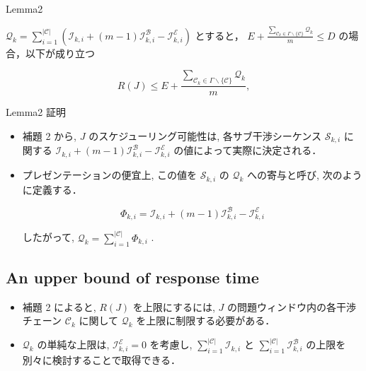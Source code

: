 \begin{frame}{Lemma2}
    \begin{lemma}[]
        $\mathcal{Q}_{k}=\sum_{i=1}^{|\mathcal{C}|}\left(\mathcal{I}_{k, i}+(m-1) \mathcal{I}_{k, i}^{\mathcal{B}}-\mathcal{I}_{k, i}^{\mathcal{E}}\right)$ とすると，
        $E+\frac{\sum_{\mathcal{C}_{k} \in \Gamma \backslash\{\mathcal{C}\}} \mathcal{Q}_{k}}{m} \leq D$ の場合，以下が成り立つ

        \begin{equation*}
            R(J) \leq E+\frac{\sum_{\mathcal{C}_{k} \in \Gamma \backslash\{\mathcal{C}\}} \mathcal{Q}_{k}}{m},
        \end{equation*}
    \end{lemma}
\end{frame}

\begin{frame}{Lemma2 証明}
    \todo{}
\end{frame}

\begin{frame}{}
    \begin{itemize}
        \item 補題 2 から, $J$ のスケジューリング可能性は, 各サブ干渉シーケンス $\mathcal{S}_{k, i}$ に関する $\mathcal{I}_{k, i}+(m-1) \mathcal{I}_{k, i}^{\mathcal{B}}-\mathcal{I}_{k, i}^{\mathcal{E}}$ の値によって実際に決定される．
        \item プレゼンテーションの便宜上, この値を $\mathcal{S}_{k, i}$ の $\mathcal{Q}_{k}$ への寄与と呼び, 次のように定義する．

              \begin{equation*}
                  \Phi_{k, i}=\mathcal{I}_{k, i}+(m-1) \mathcal{I}_{k, i}^{\mathcal{B}}-\mathcal{I}_{k, i}^{\mathcal{E}}
              \end{equation*}

              したがって, $\mathcal{Q}_{k}=\sum_{i=1}^{|\mathcal{C}|} \Phi_{k, i}$ .
    \end{itemize}
\end{frame}


\subsection{An upper bound of response time}
\label{ssec: an_upper_bound_of_response_time}

\begin{frame}{}
    \begin{itemize}
        \item 補題 2 によると, $R(J)$ を上限にするには, $J$ の問題ウィンドウ内の各干渉チェーン $\mathcal{C}_{k}$ に関して $\mathcal{Q}_{k}$ を上限に制限する必要がある．
        \item $\mathcal{Q}_{k}$ の単純な上限は, $\mathcal{I}_{k, i}^{\mathcal{E}}=0$ を考慮し, $\sum_{i=1}^{|\mathcal{C}|} \mathcal{I}_{k, i}$ と $\sum_{i=1}^{|\mathcal{C}|} \mathcal{I}_{k, i}^{\mathcal{B}}$ の上限を別々に検討することで取得できる．
    \end{itemize}
\end{frame}

